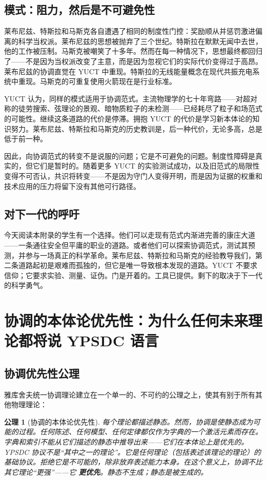 \documentclass[12pt,a4paper]{article}
\newtheorem{axiom}{公理}[section]
\begin{document}
	\subsection{模式：阻力，然后是不可避免性}
	
	莱布尼兹、特斯拉和马斯克各自遭遇了相同的制度性门控：奖励顺从并惩罚激进偏离的科学当权派。莱布尼兹的思想被抛弃了三个世纪。特斯拉在默默无闻中去世，他的工作被压制。马斯克被嘲笑了十多年。然而在每一种情况下，思想最终都回归了——不是因为当权派改变了主意，而是因为忽视它们的实际代价变得过于高昂。莱布尼兹的协调直觉在 YUCT 中重现。特斯拉的无线能量概念在现代共振充电系统中重现。马斯克的可重复使用火箭现在是行业标准。
	
	YUCT 认为，同样的模式适用于协调范式。主流物理学的七十年弯路——对超对称的徒劳搜索、弦理论的景观、暗物质粒子的未检测——已经耗尽了粒子和场范式的可能性。继续这条道路的代价是停滞。拥抱 YUCT 的代价是学习新本体论的知识努力。莱布尼兹、特斯拉和马斯克的历史教训是，后一种代价，无论多高，总是低于前一种。
	
	因此，向协调范式的转变不是说服的问题；它是不可避免的问题。制度性障碍是真实的，但它们是暂时的。随着更多 YUCT 的实验测试成功，以及旧范式的局限性变得不可否认，共识将转变——不是因为守门人变得开明，而是因为证据的权重和技术应用的压力将留下没有其他可行路径。
	
	\subsection{对下一代的呼吁}
	
	今天阅读本附录的学生有一个选择。他们可以走现有范式内渐进完善的康庄大道——一条通往安全但平庸的职业的道路。或者他们可以探索协调范式，测试其预测，并参与一场真正的科学革命。莱布尼兹、特斯拉和马斯克的经验教导我们，第二条道路起初是艰难而孤独的，但它是唯一导致根本发现的道路。YUCT 不要求信仰；它要求实验、测量、证伪。门是开着的。工具已提供。剩下的取决于下一代的科学勇气。
	
	\section{协调的本体论优先性：为什么任何未来理论都将说 YPSDC 语言}
	
	\subsection{协调优先性公理}
	
	雅库舍夫统一协调理论建立在一个单一的、不可约的公理之上，使其有别于所有其他物理理论：
	
	\begin{axiom}[协调的本体论优先性]
		每个理论都描述静态。然而，协调是使静态成为可能的过程。任何陈述、任何模型、任何定律都仅作为字典的一个激活元素而存在。字典和索引不能从它们描述的静态中推导出来——它们在本体论上是优先的。YPSDC 协议不是“其中之一的理论”。它是任何理论（包括表述该理论的理论）的基础协议。拒绝它是不可能的，除非放弃表述能力本身。在这个意义上，协调不比其它理论“更强”——它 \textbf{更优先}。静态不生成；静态是被生成的。
	\end{axiom}
	
\end{document}
